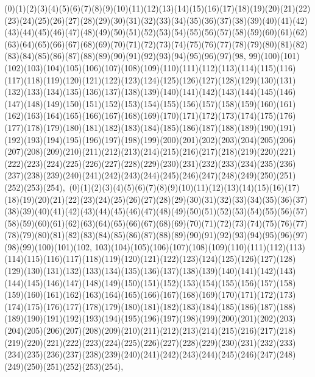 \documentclass[12pt]{article}
\begin{document}
{(0)(1)(2)(3)(4)(5)(6)(7)(8)(9)(10)(11)(12)(13)(14)(15)(16)(17)(18)(19)(20)(21)(22)(23)(24)(25)(26)(27)(28)(29)(30)(31)(32)(33)(34)(35)(36)(37)(38)(39)(40)(41)(42)(43)(44)(45)(46)(47)(48)(49)(50)(51)(52)(53)(54)(55)(56)(57)(58)(59)(60)(61)(62)(63)(64)(65)(66)(67)(68)(69)(70)(71)(72)(73)(74)(75)(76)(77)(78)(79)(80)(81)(82)(83)(84)(85)(86)(87)(88)(89)(90)(91)(92)(93)(94)(95)(96)(97)(98, 99)(100)(101)(102)(103)(104)(105)(106)(107)(108)(109)(110)(111)(112)(113)(114)(115)(116)(117)(118)(119)(120)(121)(122)(123)(124)(125)(126)(127)(128)(129)(130)(131)(132)(133)(134)(135)(136)(137)(138)(139)(140)(141)(142)(143)(144)(145)(146)(147)(148)(149)(150)(151)(152)(153)(154)(155)(156)(157)(158)(159)(160)(161)(162)(163)(164)(165)(166)(167)(168)(169)(170)(171)(172)(173)(174)(175)(176)(177)(178)(179)(180)(181)(182)(183)(184)(185)(186)(187)(188)(189)(190)(191)(192)(193)(194)(195)(196)(197)(198)(199)(200)(201)(202)(203)(204)(205)(206)(207)(208)(209)(210)(211)(212)(213)(214)(215)(216)(217)(218)(219)(220)(221)(222)(223)(224)(225)(226)(227)(228)(229)(230)(231)(232)(233)(234)(235)(236)(237)(238)(239)(240)(241)(242)(243)(244)(245)(246)(247)(248)(249)(250)(251)(252)(253)(254)$
, 
$
(0)(1)(2)(3)(4)(5)(6)(7)(8)(9)(10)(11)(12)(13)(14)(15)(16)(17)(18)(19)(20)(21)(22)(23)(24)(25)(26)(27)(28)(29)(30)(31)(32)(33)(34)(35)(36)(37)(38)(39)(40)(41)(42)(43)(44)(45)(46)(47)(48)(49)(50)(51)(52)(53)(54)(55)(56)(57)(58)(59)(60)(61)(62)(63)(64)(65)(66)(67)(68)(69)(70)(71)(72)(73)(74)(75)(76)(77)(78)(79)(80)(81)(82)(83)(84)(85)(86)(87)(88)(89)(90)(91)(92)(93)(94)(95)(96)(97)(98)(99)(100)(101)(102, 103)(104)(105)(106)(107)(108)(109)(110)(111)(112)(113)(114)(115)(116)(117)(118)(119)(120)(121)(122)(123)(124)(125)(126)(127)(128)(129)(130)(131)(132)(133)(134)(135)(136)(137)(138)(139)(140)(141)(142)(143)(144)(145)(146)(147)(148)(149)(150)(151)(152)(153)(154)(155)(156)(157)(158)(159)(160)(161)(162)(163)(164)(165)(166)(167)(168)(169)(170)(171)(172)(173)(174)(175)(176)(177)(178)(179)(180)(181)(182)(183)(184)(185)(186)(187)(188)(189)(190)(191)(192)(193)(194)(195)(196)(197)(198)(199)(200)(201)(202)(203)(204)(205)(206)(207)(208)(209)(210)(211)(212)(213)(214)(215)(216)(217)(218)(219)(220)(221)(222)(223)(224)(225)(226)(227)(228)(229)(230)(231)(232)(233)(234)(235)(236)(237)(238)(239)(240)(241)(242)(243)(244)(245)(246)(247)(248)(249)(250)(251)(252)(253)(254)$
, 
$
}
\end{document}
